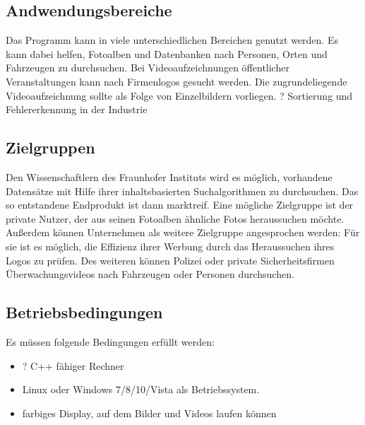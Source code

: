 \subsection{Andwendungsbereiche}

Das Programm kann in viele unterschiedlichen Bereichen genutzt werden. Es kann dabei helfen, Fotoalben und Datenbanken nach Personen, Orten und Fahrzeugen zu durchsuchen. Bei Videoaufzeichnungen öffentlicher Veranstaltungen kann nach Firmenlogos gesucht werden. Die zugrundeliegende Videoaufzeichnung sollte als Folge von Einzelbildern vorliegen.
? Sortierung und Fehlererkennung in der Industrie

\subsection{Zielgruppen}

Den Wissenschaftlern des Fraunhofer Instituts wird es möglich, vorhandene Datensätze mit Hilfe ihrer inhaltsbasierten Suchalgorithmen zu durchsuchen. Das so entstandene Endprodukt ist dann marktreif.
Eine mögliche Zielgruppe ist der private Nutzer, der aus seinen Fotoalben ähnliche Fotos heraussuchen möchte. 
Außerdem können Unternehmen als weitere Zielgruppe angesprochen werden: Für sie ist es möglich, die Effizienz ihrer Werbung durch das Heraussuchen ihres Logos zu prüfen. 
Des weiteren können Polizei oder private Sicherheitsfirmen Überwachungsvideos nach Fahrzeugen oder Personen durchsuchen.

\subsection{Betriebsbedingungen}

Es müssen folgende Bedingungen erfüllt werden:

\begin{itemize}

\item ? C++ fähiger Rechner
\item Linux oder Windows 7/8/10/Vista als Betriebssystem.
\item farbiges Display, auf dem Bilder und Videos laufen können 

\end{itemize}
